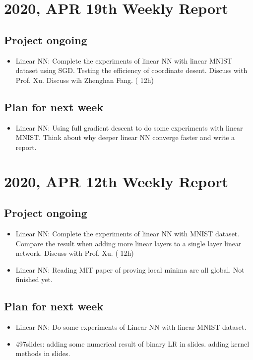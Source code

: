 \documentclass[10pt]{amsart}
\begin{document}
\section{2020, APR 19th Weekly Report }
\subsection{Project ongoing}
\begin{itemize}
	\item Linear NN: Complete the experiments of linear NN with  linear MNIST dataset using SGD.  Testing the efficiency of coordinate desent. Discuss with Prof. Xu. Discuss wih Zhenghan Fang. ({\color{blue} 12h})
\end{itemize}
\subsection{Plan for next week}
\begin{itemize}
	\item Linear NN: Using full gradient descent to do some experiments with linear MNIST. Think about why deeper linear NN converge faster and write a report.
\end{itemize}

\section{2020, APR 12th Weekly Report }
\subsection{Project ongoing}
\begin{itemize}
	\item Linear NN: Complete the experiments of linear NN with MNIST dataset. Compare the result when adding more linear layers  to a single layer linear network. Discuss with Prof. Xu. ({\color{blue} 12h})
	\item Linear NN: Reading MIT paper of proving local minima are all global. Not finished yet.
\end{itemize}
\subsection{Plan for next week}
\begin{itemize}
	\item Linear NN: Do some experiments of Linear NN with linear MNIST dataset.
	\item 497slides: adding some numerical result of binary LR in slides. adding kernel methods in slides.
	
\end{itemize}
\end{document}
